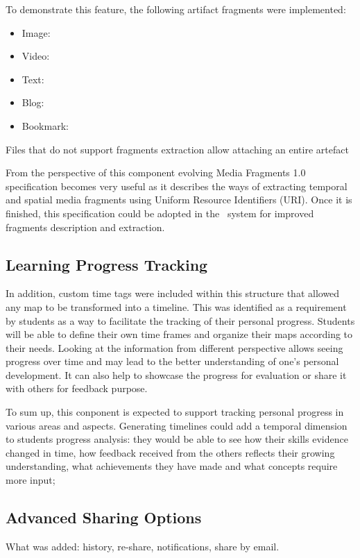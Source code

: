 To demonstrate this feature, the following artifact fragments were implemented:

\begin{itemize}
  \item Image:
  \item Video:
  \item Text:
  \item Blog:
  \item Bookmark:
\end{itemize} 

Files that do not support fragments extraction allow attaching an entire
artefact


From the perspective of this component evolving Media Fragments 1.0
specification \citep{MediaGroup2011} becomes very useful as it describes the
ways of extracting temporal and spatial media fragments using Uniform Resource
Identifiers (URI). Once it is finished, this specification could be adopted in
the \ep~system for improved fragments description and extraction.

\subsection{Learning Progress Tracking}
\label{sec:timeline}

In addition, custom time tags were included within this structure that allowed
any map to be transformed into a timeline. This was identified as a requirement
by students as a way to facilitate the tracking of their personal progress.
Students will be able to define their own time frames and organize their maps
according to their needs. Looking at the information from different perspective
allows seeing progress over time and may lead to the better understanding of
one's personal development. It can also help to showcase the progress for
evaluation or share it with others for feedback purpose.



To sum up, this conponent is expected to support tracking personal progress in
various areas and aspects. Generating timelines could add a temporal dimension
to students progress analysis: they would be able to see how their skills evidence
changed in time, how feedback received from the others reflects their growing
understanding, what achievements they have made and what concepts require more
input;


\subsection{Advanced Sharing Options}
\label{sec:sharing}
What was added: history, re-share, notifications, share by email.


